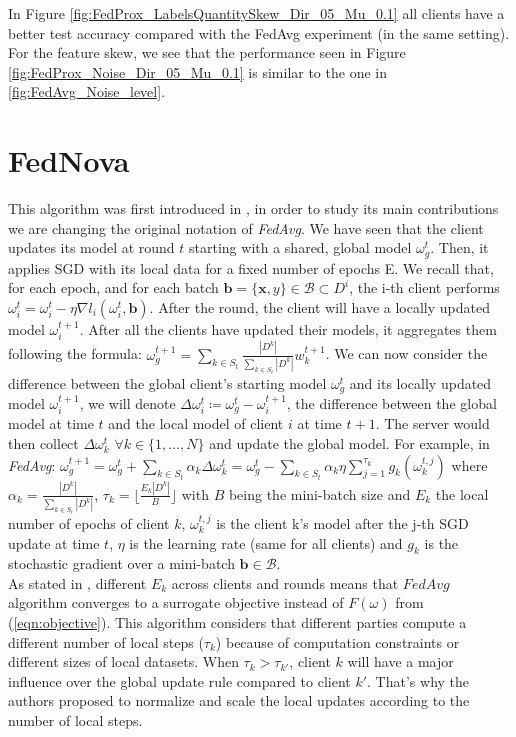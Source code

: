 In Figure \ref{fig:FedProx_LabelsQuantitySkew_Dir_05_Mu_0.1} all clients have a better test accuracy compared with the FedAvg experiment (in the same setting). For the feature skew, we see that the performance seen in Figure \ref{fig:FedProx_Noise_Dir_05_Mu_0.1} is similar to the one in \ref{fig:FedAvg_Noise_level}.

\section{FedNova}

This algorithm was first introduced in \cite*{wang2020}, in order to study its main contributions we are changing the original notation of \textit{FedAvg}. We have seen that the client updates its model at round $t$ starting with a shared, global model $\omega_g^t$. Then, it applies SGD with its local data for a fixed number of epochs E.
We recall that, for each epoch, and for each batch $\mathbf{b} = \{\mathbf{x}, y\} \in \mathcal{B} \subset D^i$, the i-th client performs $\omega_i^t = \omega_i^t - \eta \nabla l_i(\omega_i^t, \mathbf{b})$. After the round, the client will have a locally updated model $\omega_i^{t+1}$. After all the clients have updated their models, it aggregates them following the formula: $\omega_g^{t+1} = \sum_{k \in S_t} \frac{|D^k|}{\sum_{k\in S_t} |D^k|} w_k^{t+1}$.
We can now consider the difference between the global client's starting model $\omega_g^t$ and its locally updated model $\omega_i^{t+1}$, we will denote $\Delta \omega_i^t \coloneqq \omega_g^t - \omega_i^{t+1}$, the difference between the global model at time $t$ and the local model of client $i$ at time $t+1$.
The server would then collect $\Delta \omega_k^t$ $\forall k \in \{1,\dots, N\}$ and update the global model. For example, in \textit{FedAvg}: $\omega_g^{t+1} = \omega_g^t + \sum_{k \in S_t} \alpha_k \Delta \omega_k^t = \omega_g^t - \sum_{k \in S_t} \alpha_k \eta \sum_{j=1}^{\tau_k} g_k(\omega_k^{t, j})$ where $\alpha_k = \frac{|D^k|}{\sum_{k\in S_t} |D^k|}$, $\tau_k = \lfloor \frac{E_k |D^k|}{B} \rfloor$ with $B$ being the mini-batch size and $E_k$ the local number of epochs of client $k$, $\omega_k^{t,j}$ is the client k's model after the j-th SGD update at time $t$, $\eta$ is the learning rate (same for all clients) and $g_k$ is the stochastic gradient over a mini-batch $\mathbf{b} \in \mathcal{B}$.\\
As stated in \cite*{wang2020}, different $E_k$ across clients and rounds means that $FedAvg$ algorithm converges to a surrogate objective instead of $F(\omega)$ from (\ref{eqn:objective}).
This algorithm considers that different parties compute a different number of local steps ($\tau_k$) because of computation constraints or different sizes of local datasets. When $\tau_{k} > \tau_{k'}$, client $k$ will have a major influence over the global update rule compared to client $k'$. That's why the authors proposed to normalize and scale the local updates according to the number of local steps.

